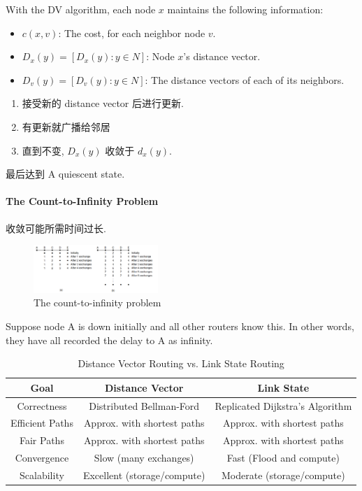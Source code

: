 With the DV algorithm, each node $x$ maintains the following information:
\begin{itemize}
    \item $c(x, v)$: The cost, for each neighbor node $v$.
    \item $D_x(y)=[D_x(y):y\in N]$: Node $x$'s distance vector.
    \item $D_v(y)=[D_v(y):y\in N]$: The distance vectors of each of its neighbors.
\end{itemize}

\begin{enumerate}
    \item 接受新的 distance vector 后进行更新. 
    \item 有更新就广播给邻居
    \item 直到不变, $D_x(y)$ 收敛于 $d_x(y)$.
\end{enumerate}

最后达到 A quiescent state. 

\paragraph{The Count-to-Infinity Problem}
收敛可能所需时间过长. 

\begin{figure}[!htb]
    \centering
    \includegraphics[width=0.42\textwidth]{pic/CN5/The count-to-infinity problem}
    \caption{The count-to-infinity problem}
\end{figure}
Suppose node A is down initially and all other routers know this. In other words, they have all recorded the delay to A as infinity.

\begin{table}[!htb]
    \centering
    \caption{Distance Vector Routing vs. Link State Routing}
    \begin{tabular}[c]{c|cc}\toprule
        \multicolumn{1}{c}{\textbf{Goal}} & \textbf{Distance Vector} & \textbf{Link State} \\ \midrule
        Correctness & Distributed Bellman-Ford & Replicated Dijkstra's Algorithm \\
        Efficient Paths & Approx. with shortest paths & Approx. with shortest paths \\
        Fair Paths & Approx. with shortest paths & Approx. with shortest paths \\
        Convergence & Slow (many exchanges) & Fast (Flood and compute) \\
        Scalability & Excellent (storage/compute) & Moderate (storage/compute) \\
        \bottomrule
    \end{tabular}
\end{table}



